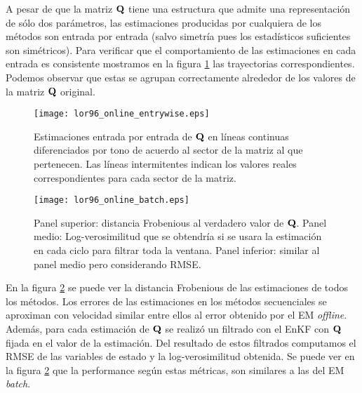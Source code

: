 A pesar de que la matriz $\mathbf{Q}$ tiene una estructura que admite una representación de sólo dos parámetros, las estimaciones producidas por cualquiera de los métodos son entrada por entrada (salvo simetría pues los estadísticos suficientes son simétricos). Para verificar que el comportamiento de las estimaciones en cada entrada es consistente mostramos en la figura \ref{fig:lor96_online_entrywise} las trayectorias correspondientes. Podemos observar que estas se agrupan correctamente alrededor de los valores de la matriz $\mathbf{Q}$ original.
\begin{figure}[h]
    \centering
    \texttt{[image: lor96\_online\_entrywise.eps]}
    \caption{Estimaciones entrada por entrada de $\mathbf{Q}$ en líneas continuas diferenciados por tono de acuerdo al sector de la matriz al que pertenecen. Las líneas intermitentes indican los valores reales correspondientes para cada sector de la matriz.}
    \label{fig:lor96_online_entrywise}
\end{figure}
\begin{figure}[h]
    \centering
    \texttt{[image: lor96\_online\_batch.eps]}
    \caption{Panel superior: distancia Frobenious al verdadero valor de $\mathbf{Q}$. Panel medio: Log-verosimilitud que se obtendría si se usara la estimación en cada ciclo para filtrar toda la ventana. Panel inferior: similar al panel medio pero considerando RMSE.}
    \label{fig:lor96_online_batch}
\end{figure}
En la figura \ref{fig:lor96_online_batch} se puede ver la distancia Frobenious de las estimaciones de todos los métodos. Los errores de las estimaciones en los métodos secuenciales se aproximan con velocidad similar entre ellos al error obtenido por el EM \textit{offline}. Además, para cada estimación de $\mathbf{Q}$ se realizó un filtrado con el EnKF con $\mathbf{Q}$ fijada en el valor de la estimación. Del resultado de estos filtrados computamos el RMSE de las variables de estado y la log-verosimilitud obtenida. Se puede ver en la figura \ref{fig:lor96_online_batch} que la performance según estas métricas, son similares a las del EM \textit{batch}.

